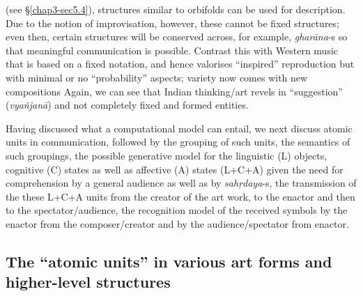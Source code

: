  (see \S\ref{chap3-sec5.4}), structures similar to orbifolds can be used for description. Due to the notion of improvisation, however, these cannot be fixed structures; even then, certain structures will be conserved across, for example, \textsl{gharāna}-s so that meaningful communication is possible. Contrast this with Western music that is based on a fixed notation, and hence valorises “inspired” reproduction but with minimal or no “probability” aspects; variety now comes with new compositions Again, we can see that Indian thinking/art revels in “suggestion” (\textsl{vyañjanā}) and not completely fixed and formed entities.

Having discussed what a computational model can entail, we next discuss atomic units in communication, followed by the grouping of such units, the semantics of such groupings, the possible generative model for the linguistic (L) objects, cognitive (C) states as well as affective (A) states (L+C+A) given the need for comprehension by a general audience as well as by \textsl{sahṛdaya}-s, the transmission of the these L+C+A units from the creator of the art work, to the enactor and then to the spectator/audience, the recognition model of the received symbols by the enactor from the composer/creator and by the audience/spectator from enactor.

\subsection{The “atomic units” in various art forms and higher-level structures}\label{chap3-sec4.1}

